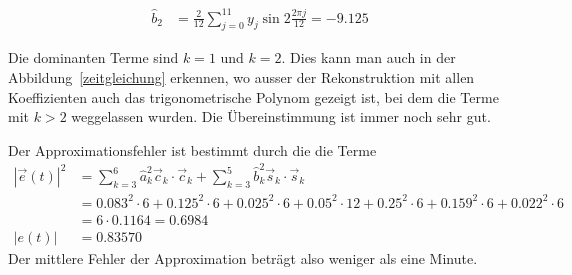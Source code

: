 \begin{loesung}
\begin{teilaufgaben}
\begin{align*}
\hat b_2
&=
\frac{2}{12}
\sum_{j=0}^{11}
y_j \sin 2\frac{2\pi j}{12}
=
-9.125
\end{align*}
\item
Die dominanten Terme sind $k=1$ und $k=2$.
Dies kann man auch in der Abbildung~\ref{zeitgleichung} erkennen, wo
ausser der Rekonstruktion mit allen Koeffizienten auch das
trigonometrische Polynom gezeigt ist, bei dem die Terme mit $k>2$ weggelassen
wurden.
Die Übereinstimmung ist immer noch sehr gut.
\item
Der Approximationsfehler ist bestimmt durch die die Terme 
\begin{align*}
|\vec{e}(t)|^2
&=
\sum_{k=3}^6 \hat a_k^2 \vec{c}_k\cdot\vec{c}_k
+
\sum_{k=3}^5 \hat b_k^2 \vec{s}_k\cdot\vec{s}_k
\\
&=
0.083^2\cdot 6
+0.125^2\cdot 6
+0.025^2\cdot 6
+0.05^2\cdot 12
+0.25^2\cdot 6
+0.159^2\cdot 6
+0.022^2\cdot 6
\\
&=
6\cdot 0.1164
=
0.6984
\\
|e(t)|
&=
0.83570
\end{align*}
Der mittlere Fehler der Approximation beträgt also weniger als eine Minute.
\qedhere
\end{teilaufgaben}
\end{loesung}

